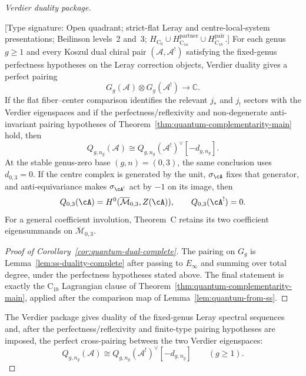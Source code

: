 \begin{proof}[Verdier duality package]
\begin{corollary}
\label{cor:quantum-dual-complete}
\textup{[Type signature: Open quadrant; strict-flat Leray and
centre-local-system presentations; Beilinson levels~2 and~3;
\(H_{\mathrm C_0}\cup H_{\mathrm C_{1a}}^{\mathrm{partner}}
\cup H_{\mathrm C_{1b}}^{\mathrm{pair}}\).]}
For each genus $g \geq 1$ and every Koszul dual chiral pair
$(\mathcal{A}, \mathcal{A}^!)$ satisfying the fixed-genus
perfectness hypotheses on the Leray correction objects, Verdier
duality gives a perfect pairing
\begin{equation}
G_g(\mathcal{A}) \otimes G_g(\mathcal{A}^!) \longrightarrow \mathbb{C}.
\end{equation}
If the flat fiber--center comparison identifies the relevant
$j_*$ and $j_!$ sectors with the Verdier eigenspaces and if the
perfectness/reflexivity and non-degenerate anti-invariant pairing
hypotheses of
Theorem~\textup{\ref{thm:quantum-complementarity-main}} hold, then
\[
Q_{g,n_g}(\mathcal{A})
\cong Q_{g,n_g}(\mathcal{A}^!)^\vee[-d_{g,n_g}] .
\]
At the stable genus-zero base \((g,n)=(0,3)\), the same conclusion
uses \(d_{0,3}=0\).  If the centre complex is generated by the unit,
\(\sigma_{\cA}\) fixes that generator, and anti-equivariance makes
\(\sigma_{\cA^!}\) act by \(-1\) on its image, then
\[
 Q_{0,3}(\cA)=H^0(\overline{\mathcal M}_{0,3},Z(\cA)),
 \qquad Q_{0,3}(\cA^!)=0.
\]
For a general coefficient involution, Theorem~C retains its two
coefficient eigensummands on \(\overline{\mathcal M}_{0,3}\).
\end{corollary}

\begin{proof}[Proof of Corollary~\ref{cor:quantum-dual-complete}]
The pairing on $G_g$ is Lemma~\ref{lem:ss-duality-complete} after
passing to $E_\infty$ and summing over total degree, under the
perfectness hypotheses stated above. The final statement is exactly
the $\mathrm{C}_{1b}$ Lagrangian clause of
Theorem~\ref{thm:quantum-complementarity-main}, applied after the
comparison map of Lemma~\ref{lem:quantum-from-ss}.
\end{proof}

The Verdier package gives duality of the fixed-genus Leray spectral
sequences and, after the perfectness/reflexivity and finite-type
pairing hypotheses are imposed, the perfect cross-pairing between the
two Verdier eigenspaces:
\begin{equation}
Q_{g,n_g}(\mathcal{A})
\cong Q_{g,n_g}(\mathcal{A}^!)^\vee[-d_{g,n_g}]
\qquad (g\geq1).
\end{equation}
\end{proof}

